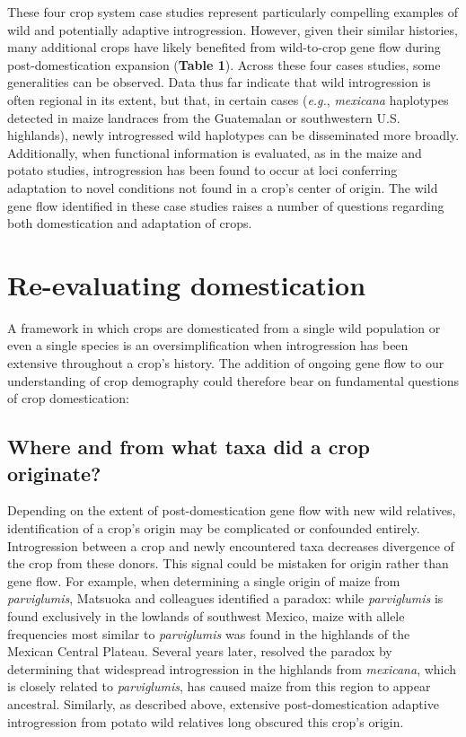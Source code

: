 \documentclass[11pt]{article}
\begin{document}
These four crop system case studies represent particularly compelling examples of wild and potentially adaptive introgression.
However, given their similar histories, many additional crops have likely benefited from wild-to-crop gene flow during post-domestication expansion (\textbf{Table 1}).
Across these four cases studies, some generalities can be observed.
Data thus far indicate that wild introgression is often regional in its extent, but that, in certain cases (\emph{e.g.}, \emph{mexicana} haplotypes detected in maize landraces from the Guatemalan or southwestern U.S. highlands), newly introgressed wild haplotypes can be disseminated more broadly.
Additionally, when functional information is evaluated, as in the maize and potato studies, introgression has been found to occur at loci conferring adaptation to novel conditions not found in a crop's center of origin.
The wild gene flow identified in these case studies raises a number of questions regarding both domestication and adaptation of crops.

\section*{Re-evaluating domestication}

A framework in which crops are domesticated from a single wild population or even a single species is an oversimplification when introgression has been extensive throughout a crop's history.
The addition of ongoing gene flow to our understanding of crop demography could therefore bear on fundamental questions of crop domestication:

\subsection*{Where and from what taxa did a crop originate?}
Depending on the extent of post-domestication gene flow with new wild relatives, identification of a crop's origin may be complicated or confounded entirely.
Introgression between a crop and newly encountered taxa decreases divergence of the crop from these donors.
This signal could be mistaken for origin rather than gene flow.
For example, when determining a single origin of maize from \emph{parviglumis}, Matsuoka and colleagues \citeyearpar{matsuoka2002single} identified a paradox: while \emph{parviglumis} is found exclusively in the lowlands of southwest Mexico, maize with allele frequencies most similar to \emph{parviglumis} was found in the highlands of the Mexican Central Plateau.
Several years later, \citet{vanHeerwaarden2011} resolved the paradox by determining that widespread introgression in the highlands from \emph{mexicana}, which is closely related to \emph{parviglumis}, has caused maize from this region to appear ancestral.
Similarly, as described above, extensive post-domestication adaptive introgression from potato wild relatives long obscured this crop's origin.
\end{document}
